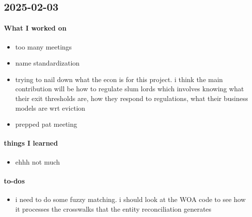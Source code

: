 \subsection{2025-02-03}

\paragraph{What I worked on}
\begin{itemize}
    \item too many meetings
    \item name standardization
    \item trying to nail down what the econ is for this project. i think the main contribution will be how to regulate slum lords which involves knowing what their exit thresholds are, how they respond to regulations, what their business models are wrt eviction
    \item prepped pat meeting
\end{itemize}

\paragraph{things I learned}
\begin{itemize}
    \item ehhh not much
\end{itemize}

\paragraph{to-dos}
\begin{itemize}
    \item i need to do some fuzzy matching. i should look at the WOA code to see how it processes the crosswalks that the entity reconciliation generates
\end{itemize}